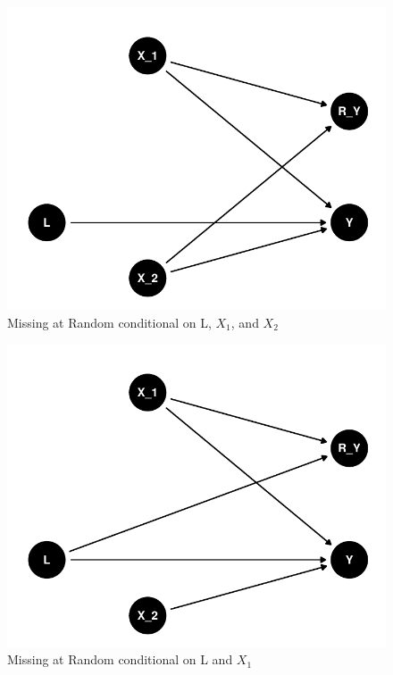 \documentclass{article}
\begin{document}
\begin{figure}

{\centering \includegraphics{Final_Report_files/figure-latex/unnamed-chunk-2-1} 

}

\caption{Missing at Random conditional on L, \ensuremath{X_1}, and \ensuremath{X_2}}\label{fig:unnamed-chunk-2}
\end{figure}

\begin{figure}

{\centering \includegraphics{Final_Report_files/figure-latex/unnamed-chunk-3-1} 

}

\caption{Missing at Random conditional on L and \ensuremath{X_1}}\label{fig:unnamed-chunk-3}
\end{figure}
\end{document}
